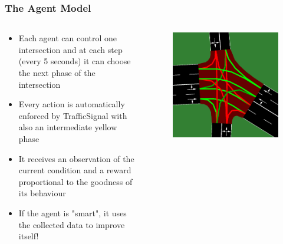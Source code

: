 \documentclass[dvipsnames]{beamer}
\begin{document}
\begin{frame}
\frametitle{The Agent Model}
  \begin{columns}
    \begin{column}{0.6\textwidth}
    {\small
    \begin{itemize}
      \item Each agent can control one intersection and at each step (every 5 seconds) it can choose the next phase of the intersection
      \item Every action is automatically enforced by TrafficSignal with also an intermediate yellow phase
      \item It receives an observation of the current condition and a reward proportional to the goodness of its behaviour
      \item If the agent is "smart", it uses the collected data to improve itself!
    \end{itemize}}
    \end{column}
    \begin{column}{0.4\textwidth}
      \begin{figure}
        \centering
        \includegraphics[width=1.0\textwidth]{figures/sumo-rf-agent.png}
      \end{figure}
    \end{column}
  \end{columns}
\end{frame}
\end{document}
